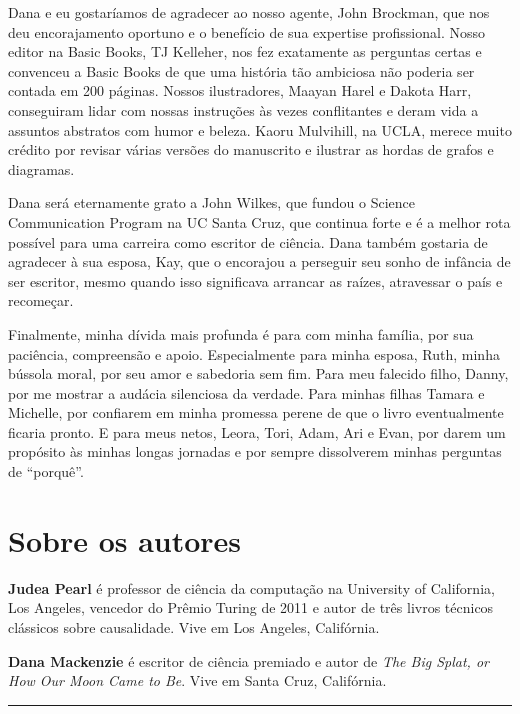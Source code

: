 \documentclass[11pt,a5paper,twoside]{book}
\begin{document}
Dana e eu gostaríamos de agradecer ao nosso agente, John Brockman, que nos deu encorajamento oportuno e o benefício de sua expertise profissional. Nosso editor na Basic Books, TJ Kelleher, nos fez exatamente as perguntas certas e convenceu a Basic Books de que uma história tão ambiciosa não poderia ser contada em 200 páginas. Nossos ilustradores, Maayan Harel e Dakota Harr, conseguiram lidar com nossas instruções às vezes conflitantes e deram vida a assuntos abstratos com humor e beleza. Kaoru Mulvihill, na UCLA, merece muito crédito por revisar várias versões do manuscrito e ilustrar as hordas de grafos e diagramas.

Dana será eternamente grato a John Wilkes, que fundou o Science Communication Program na UC Santa Cruz, que continua forte e é a melhor rota possível para uma carreira como escritor de ciência. Dana também gostaria de agradecer à sua esposa, Kay, que o encorajou a perseguir seu sonho de infância de ser escritor, mesmo quando isso significava arrancar as raízes, atravessar o país e recomeçar.

Finalmente, minha dívida mais profunda é para com minha família, por sua paciência, compreensão e apoio. Especialmente para minha esposa, Ruth, minha bússola moral, por seu amor e sabedoria sem fim. Para meu falecido filho, Danny, por me mostrar a audácia silenciosa da verdade. Para minhas filhas Tamara e Michelle, por confiarem em minha promessa perene de que o livro eventualmente ficaria pronto. E para meus netos, Leora, Tori, Adam, Ari e Evan, por darem um propósito às minhas longas jornadas e por sempre dissolverem minhas perguntas de “porquê”.

\chapter{Sobre os autores}
\textbf{Judea Pearl} é professor de ciência da computação na University of California, Los Angeles, vencedor do Prêmio Turing de 2011 e autor de três livros técnicos clássicos sobre causalidade. Vive em Los Angeles, Califórnia.

\textbf{Dana Mackenzie} é escritor de ciência premiado e autor de \textit{The Big Splat, or How Our Moon Came to Be}. Vive em Santa Cruz, Califórnia.

\vspace{1em}\hrule\vspace{1em}
\end{document}
